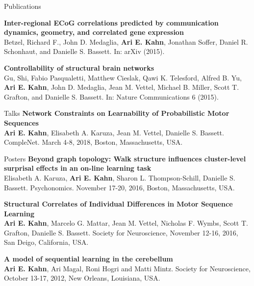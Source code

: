 \documentclass{resume} %
\begin{document}
\begin{rSection}{Publications}


\textbf{Inter-regional ECoG correlations predicted by communication dynamics, geometry, and correlated gene expression} \\
Betzel, Richard F., John D. Medaglia, \textbf{Ari E. Kahn}, Jonathan Soffer, Daniel R. Schonhaut, and Danielle S. Bassett. In: arXiv (2015).

\textbf{Controllability of structural brain networks} \\
Gu, Shi, Fabio Pasqualetti, Matthew Cieslak, Qawi K. Telesford, Alfred B. Yu, \textbf{Ari E. Kahn}, John D. Medaglia, Jean M. Vettel, Michael B. Miller, Scott T. Grafton, and Danielle S. Bassett. In: Nature Communications 6 (2015).

\end{rSection}


\begin{rSection}{Talks}
\textbf{Network Constraints on Learnability of Probabilistic Motor Sequences} \\
\textbf{Ari E. Kahn}, Elisabeth A. Karuza, Jean M. Vettel, Danielle S. Bassett. CompleNet. March 4-8, 2018, Boston, Massachusetts, USA.
\end{rSection}

\begin{rSection}{Posters}
\textbf{Beyond graph topology: Walk structure influences cluster-level surprisal effects in an on-line learning task} \\
Elisabeth A. Karuza, \textbf{Ari E. Kahn}, Sharon L. Thompson-Schill, Danielle S. Bassett. Psychonomics. November 17-20, 2016, Boston, Massachusetts, USA.

\textbf{Structural Correlates of Individual Differences in Motor Sequence Learning} \\
\textbf{Ari E. Kahn}, Marcelo G. Mattar, Jean M. Vettel, Nicholas F. Wymbs, Scott T. Grafton, Danielle S. Bassett. Society for Neuroscience, November 12-16, 2016, San Deigo, California, USA.

\textbf{A model of sequential learning in the cerebellum} \\
\textbf{Ari E. Kahn}, Ari Magal, Roni Hogri and Matti Mintz.
Society for Neuroscience, October 13-17, 2012, New Orleans, Louisiana, USA.
\end{rSection}
\end{document}
